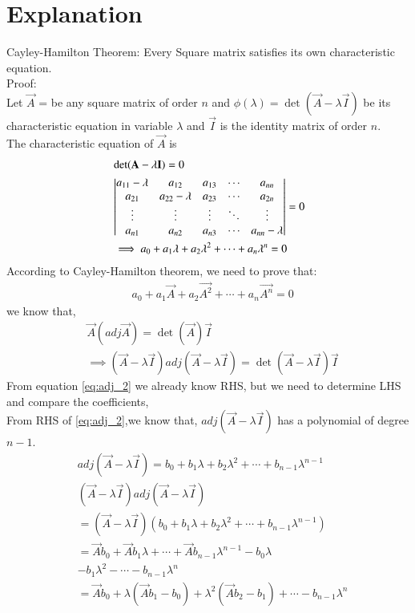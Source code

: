 \documentclass[journal,12pt,twocolumn]{IEEEtran}
\begin{document}
\section{Explanation}
Cayley-Hamilton Theorem: Every Square matrix satisfies its own characteristic equation.\\
Proof:\\
Let $\vec{A}$ =  be any square matrix of order $n$ and $\phi(\lambda) = \det({\vec{A}-\lambda \vec{I}})$ be its characteristic equation in variable $\lambda$ and $\vec{I}$ is the identity matrix of order $n$.\\
The characteristic equation of $\vec{A}$ is 
\begin{align}  
&\det({\mathbf{A}-\lambda \mathbf{I}}) = 0 \label{eq:eq_1}\\
& \begin{vmatrix}a_{11}-\lambda & a_{12} & a_{13} & \cdots & a_{nn} \\ 
a_{21} & a_{22}-\lambda & a_{23}& \cdots & a_{2n} \\
\vdots & \vdots & \vdots & \ddots &\vdots \\
a_{n1} & a_{n2} & a_{n3} & \cdots & a_{nn}-\lambda \\ \end{vmatrix} = 0\\
& \implies a_0 + a_1\lambda + a_2\lambda^{2} +  \cdots+a_n\lambda^{n} = 0\label{eq:char_eq}
\end{align}
According to Cayley-Hamilton theorem, we need to prove that:
\begin{align} 
&a_0 + a_1\vec{A} + a_2\vec{A^{2}} +  \cdots+a_n\vec{A^{n}} = 0 \label{eq:to_prove}
\end{align}
we know that,
\begin{align} 
& \vec{A}(adj\vec{A}) = \det(\vec{A})\vec{I} \label{eq:adj_1} \\
&\implies (\vec{A}-\lambda\vec{I})adj(\vec{A}-\lambda\vec{I}) = \det(\vec{A}-\lambda\vec{I})\vec{I}\label{eq:adj_2}
\end{align}
From equation \eqref{eq:adj_2} we already know RHS, but we need to determine LHS and compare the coefficients,\\
From RHS of \eqref{eq:adj_2},we know that,
$adj(\vec{A}-\lambda\vec{I})$ has a polynomial of degree $n-1$.\\
\begin{align} 
& adj(\vec{A}-\lambda\vec{I}) = b_0 + b_1\lambda + b_2\lambda^{2} +  \cdots+b_{n-1}\lambda^{n-1}\label{eq:adj_3}\\
& (\vec{A}-\lambda\vec{I}) adj(\vec{A}-\lambda\vec{I}) \\&= (\vec{A}-\lambda\vec{I})(b_0 + b_1\lambda + b_2\lambda^{2} +  \cdots+b_{n-1}\lambda^{n-1})\\
&= \vec{A}b_0 + \vec{A}b_1\lambda +\cdots+ \vec{A}b_{n-1}\lambda^{n-1}- b_0\lambda\\ 
&    - b_1\lambda^{2}-\cdots - b_{n-1}\lambda^{n}\\
&=\vec{A}b_0 + \lambda(\vec{A}b_1 - b_0) + \lambda^{2}(\vec{A}b_2 - b_1) + \cdots - b_{n-1}\lambda^{n}  \label{eq:adj_4}
\end{align}
\end{document}
